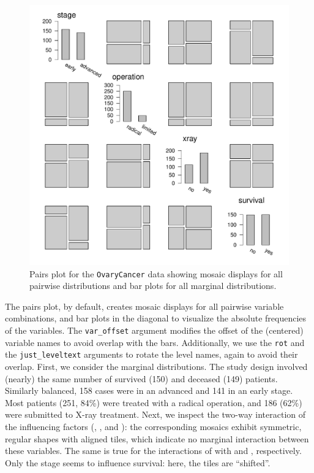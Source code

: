 \documentclass{Z}
\newcommand{\data}[1]{\texttt{#1}}
\begin{document}
\begin{figure}[h]
\begin{center}
\includegraphics{strucplot-ocpairs}
\caption{Pairs plot for the \data{OvaryCancer} data showing mosaic displays for all pairwise distributions and bar plots for all marginal distributions.}
\label{fig:ocpairs}
\end{center}
\end{figure}

\noindent The pairs plot, by default, creates mosaic displays for all pairwise 
variable combinations, and bar plots in the diagonal to visualize the absolute 
frequencies of the variables. The \texttt{var\_offset} argument modifies the offset of the 
(centered) variable names to avoid overlap with the bars. 
Additionally, we use the \texttt{rot} and the
\texttt{just\_leveltext} arguments to rotate the level names, again to avoid their overlap.
First, we consider the marginal distributions. The study design involved 
(nearly) the same number of survived (150) and deceased (149) patients. Similarly balanced,
158 cases were in an advanced and 141 in an early stage. Most patients (251, 84\%) 
were treated with a radical operation, and 186 (62\%) were submitted to
X-ray treatment. Next, we inspect
the two-way interaction of the influencing factors (, , 
and ): the
corresponding mosaics exhibit symmetric, regular shapes with aligned tiles, 
which indicate no marginal interaction between these variables. 
The same is true for the interactions of 
with  and , respectively. Only the stage seems to influence
survival: here, the tiles are ``shifted''.
\end{document}
